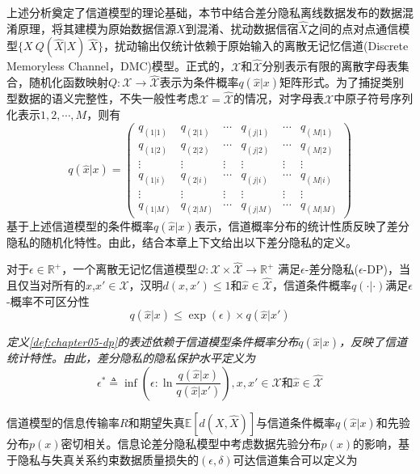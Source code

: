 上述分析奠定了信道模型的理论基础，本节中结合差分隐私离线数据发布的数据混淆原理，将其建模为原始数据信源$X$到混淆、扰动数据信宿$\hat{X}$之间的点对点通信模型$\{X~Q(\hat{X}|X)~\hat{X}\}$，扰动输出仅统计依赖于原始输入的离散无记忆信道(Discrete Memoryless Channel，DMC)模型。正式的，$\mathcal{X}$和$\mathcal{\hat{X}}$分别表示有限的离散字母表集合，随机化函数映射$Q:\mathcal{X}\rightarrow\hat{\mathcal{X}}$表示为条件概率$q(\hat{x}|x)$矩阵形式。为了捕捉类别型数据的语义完整性，不失一般性考虑$\mathcal{X}=\hat{\mathcal{X}}$的情况，对字母表$\mathcal{X}$中原子符号序列化表示$1,2,\cdots,M$，则有
\begin{equation}\label{Eq:MRR_5.2.2}\nonumber
	q(\hat{x}|x)=\begin{pmatrix}
		q_{(1|1)}& q_{(2|1)}&\cdots &q_{(j|1)}&\cdots & q_{(M|1)}\\
		q_{(1|2)}& q_{(2|2)}&\cdots &q_{(j|2)}&\cdots & q_{(M|2)}\\
		\vdots & \vdots & \vdots &\vdots &\vdots & \vdots \\
		q_{(1|i)}  & q_{(2|i)} &\cdots & q_{(j|i)}& \cdots &q_{(M|i)}\\
		\vdots & \vdots & \vdots &\vdots &\vdots & \vdots \\
		q_{(1|M)}& q_{(2|M)}&\cdots &q_{(j|M)}&\cdots & q_{(M|M)}
	\end{pmatrix}
\end{equation}
基于上述信道模型的条件概率$q(\hat{x}|x)$表示，信道概率分布的统计性质反映了差分隐私的随机化特性。由此，结合本章上下文给出以下差分隐私的定义。
\begin{definition}\textup{\cite{alvim2011differential,wang2016on}}\label{def:chapter05-dp}对于$\epsilon \in \mathbb{R}^{+}$，一个离散无记忆信道模型$\mathcal{Q}:\mathcal{X}\times \mathcal{\hat{X}}\rightarrow \mathbb{R}^{+} $ 满足$\epsilon$-差分隐私($\epsilon$-DP)，当且仅当对所有的$x$,$x'\in \mathcal{X}$，汉明$d(x,x')\leq 1$和$\hat{x}\in \mathcal{\hat{X}}$，信道条件概率$q(\cdot|\cdot)$满足$\epsilon$-概率不可区分性
	\begin{equation}
		q(\hat{x}|x)\leq \exp (\epsilon) \times q(\hat{x}|x')
	\end{equation}
\end{definition}

\begin{remark}
{\em 定义\textup{\ref{def:chapter05-dp}}的表述依赖于信道模型条件概率分布$q(\hat{x}|x)$，反映了信道统计特性。由此，差分隐私的隐私保护水平定义为
\begin{equation}\label{eq:chapter05-epsilon}
	\epsilon^{*}\triangleq \inf \left(\epsilon: \ln \frac{q(\hat{x}|x)}{q(\hat{x}|x')}\right),x,x'\in \mathcal{X}\text{和}\hat{x}\in \mathcal{\hat{X}}
\end{equation}
}
\end{remark}
信道模型的信息传输率$R$和期望失真$\mathbb{E}\left[d(X,\hat{X})\right]$与信道条件概率$q(\hat{x}|x)$和先验分布$p(x)$密切相关。信息论差分隐私模型中考虑数据先验分布$p(x)$的影响，基于隐私与失真关系约束数据质量损失的$(\epsilon,\delta)$可达信道集合可以定义为

